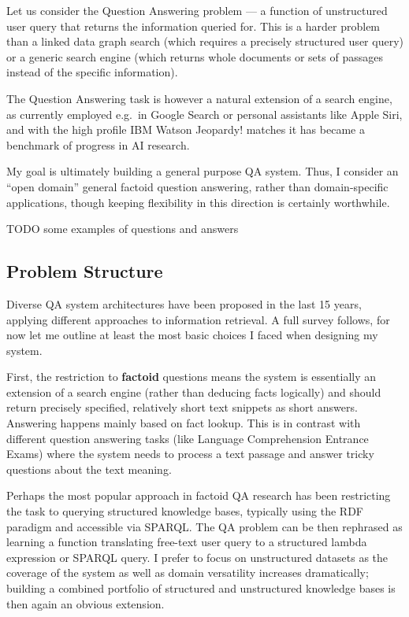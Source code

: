 Let us consider the Question Answering problem --- a function of
unstructured user query that returns the information queried for.
This is a harder problem than a linked data graph search (which requires
a precisely structured user query) or a generic search engine (which
returns whole documents or sets of passages instead of the specific
information).

The Question Answering task is however a natural extension of a search
engine, as currently employed e.g.\ in Google Search \cite{googleKG}
or personal assistants like Apple Siri, and with the high
profile IBM Watson Jeopardy! matches \cite{WatsonOverview}
it has became a benchmark of progress in AI research.

My goal is ultimately building a general purpose QA system.
Thus, I consider an ``open domain'' general factoid question answering,
rather than domain-specific applications, though keeping flexibility
in this direction is certainly worthwhile.

TODO some examples of questions and answers

\subsection{Problem Structure}

Diverse QA system architectures have been proposed in the last 15 years,
applying different approaches to information retrieval.  A full survey
follows, for now let me outline at least the most basic choices I faced
when designing my system.

First, the restriction to \textbf{factoid} questions means the system
is essentially an extension of a search engine (rather than deducing
facts logically) and should return precisely specified, relatively short
text snippets as short answers.  Answering happens mainly based on fact
lookup.  This is in contrast with different question answering tasks
(like Language Comprehension Entrance Exams) where the system needs to
process a text passage and answer tricky questions about the text meaning.

Perhaps the most popular approach in factoid QA research has been restricting
the task to querying structured knowledge bases, typically using the
RDF paradigm and accessible via SPARQL\@.  The QA problem can
be then rephrased as learning a function translating free-text user query
to a structured lambda expression or SPARQL query. \cite{Semantic2013Berant} \cite{Semantic2014Bordes}
I prefer to focus on unstructured datasets as the coverage of the system
as well as domain versatility increases dramatically; building a combined
portfolio of structured and unstructured knowledge bases
is then again an obvious extension.

